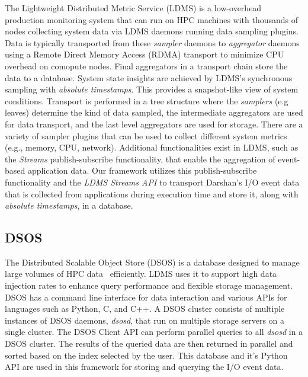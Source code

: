 The Lightweight Distributed Metric Service (LDMS) is a low-overhead production 
monitoring system that can run on HPC machines with thousands of nodes collecting 
system data via LDMS daemons running data sampling plugins.
Data is typically transported from these \emph{sampler} daemons to \emph{aggregator} 
daemons using a Remote Direct Memory Access (RDMA) transport to minimize CPU 
overhead on comopute nodes. Final aggregators in a transport chain store
the data to a database.
System state insights are achieved by LDMS's synchronous sampling with 
\emph{absolute timestamps}. This provides a snapshot-like view of system conditions.
Transport is performed in a tree structure where the \emph{samplers} (e.g leaves) 
determine the kind of data sampled, the intermediate aggregators are used for data 
transport, and the last level aggregators are used for storage. There are a variety 
of sampler plugins that can be used to collect different system metrics 
(e.g., memory, CPU, network).
Additional functionalities exist in LDMS, such as the \emph{Streams} publish-subscribe
functionality, that enable the aggregation of event-based application data. Our framework 
utilizes this publish-subscribe functionality and the \emph{LDMS Streams API} to 
transport Darshan's I/O event data that is collected from applications during 
execution time and store it, along with \emph{absolute timestamps}, in a database.

\subsection{DSOS}
The Distributed Scalable Object Store (DSOS) is a database designed to manage large 
volumes of HPC data~\cite{sosgithub} efficiently. LDMS uses it to support high 
data injection rates to enhance query performance and flexible storage management. 
DSOS has a command line interface for data interaction and various APIs for 
languages such as Python, C, and C++. A DSOS cluster consists of multiple 
instances of DSOS daemons, \emph{dsosd}, that run on multiple storage servers 
on a single cluster. The DSOS Client API can perform parallel queries to all 
\emph{dsosd} in a DSOS cluster. The results of the queried data are then returned 
in parallel and sorted based on the index selected by the user. This database and 
it's Python API are used in this framework for storing and querying the I/O event data. 
